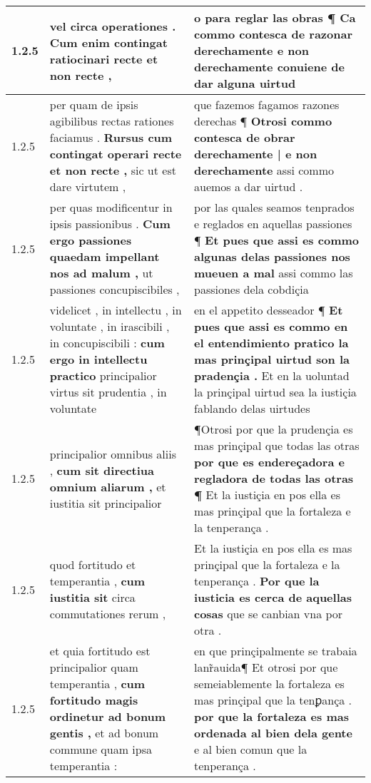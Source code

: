 \begin{tabular}{|p{1cm}|p{6.5cm}|p{6.5cm}|}
1.2.5 & vel circa operationes . \textbf{ Cum enim contingat } ratiocinari recte et non recte , & o para reglar las obras ¶ \textbf{ Ca commo contesca de razonar derechamente } e non derechamente conuiene de dar alguna uirtud \\\hline
1.2.5 & per quam de ipsis agibilibus rectas rationes faciamus . \textbf{ Rursus cum contingat operari recte et non recte , } sic ut est dare virtutem , & que fazemos fagamos razones derechas ¶ \textbf{ Otrosi commo contesca de obrar derechamente | e non derechamente } assi commo auemos a dar uirtud . \\\hline
1.2.5 & per quas modificentur in ipsis passionibus . \textbf{ Cum ergo passiones quaedam impellant nos ad malum , } ut passiones concupiscibiles , & por las quales seamos tenprados e reglados en aquellas passiones ¶ \textbf{ Et pues que assi es commo algunas delas passiones nos mueuen a mal } assi commo las passiones dela cobdiçia \\\hline
1.2.5 & videlicet , in intellectu , in voluntate , in irascibili , in concupiscibili : \textbf{ cum ergo in intellectu practico } principalior virtus sit prudentia , in voluntate & en el appetito desseador ¶ \textbf{ Et pues que assi es commo en el entendimiento pratico la mas prinçipal uirtud son la pradençia . } Et en la uoluntad la prinçipal uirtud sea la iustiçia fablando delas uirtudes \\\hline
1.2.5 & principalior omnibus aliis , \textbf{ cum sit directiua omnium aliarum , } et iustitia sit principalior & ¶Otrosi por que la prudençia es mas prinçipal que todas las otras \textbf{ por que es endereçadora e regladora de todas las otras ¶ } Et la iustiçia en pos ella es mas prinçipal que la fortaleza e la tenperança . \\\hline
1.2.5 & quod fortitudo et temperantia , \textbf{ cum iustitia sit } circa commutationes rerum , & Et la iustiçia en pos ella es mas prinçipal que la fortaleza e la tenperança . \textbf{ Por que la iusticia es cerca de aquellas cosas } que se canbian vna por otra . \\\hline
1.2.5 & et quia fortitudo est principalior quam temperantia , \textbf{ cum fortitudo magis ordinetur ad bonum gentis , } et ad bonum commune quam ipsa temperantia : & en que prinçipalmente se trabaia lanr̃auida¶ Et otrosi por que semeiablemente la fortaleza es mas prinçipal que la tenꝑança . \textbf{ por que la fortaleza es mas ordenada al bien dela gente } e al bien comun que la tenperança . \\\hline

\end{tabular}

